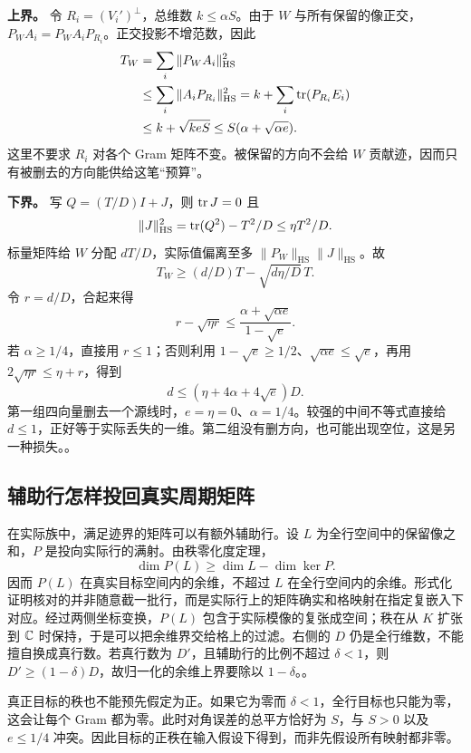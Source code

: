 \textbf{上界。} 令 $R_i=(V_i')^\perp$，总维数 $k\le\alpha S$。由于 $W$ 与所有保留的像正交，$P_WA_i=P_WA_iP_{R_i}$。正交投影不增范数，因此
\[
\begin{aligned}
 T_W &=\sum_i\|P_WA_i\|^2_{\mathrm{HS}}\\
 &\le \sum_i\|A_iP_{R_i}\|^2_{\mathrm{HS}}
 =k+\sum_i\operatorname{tr}(P_{R_i}E_i)\\
 &\le k+\sqrt{k e S}\le S(\alpha+\sqrt{\alpha e}).
\end{aligned}
\]
这里不要求 $R_i$ 对各个 Gram 矩阵不变。被保留的方向不会给 $W$ 贡献迹，因而只有被删去的方向能供给这笔“预算”。

\textbf{下界。} 写 $Q=(T/D)I+J$，则 $\operatorname{tr} J=0$ 且
\[
 \|J\|^2_{\mathrm{HS}}=\operatorname{tr}(Q^2)-T^2/D\le\eta T^2/D.
\]
标量矩阵给 $W$ 分配 $dT/D$，实际值偏离至多 $\|P_W\|_{\mathrm{HS}}\|J\|_{\mathrm{HS}}$。故
\[
             T_W\ge (d/D)T-\sqrt{d\eta/D}\,T.
\]
令 $r=d/D$，合起来得
\[
          r-\sqrt{\eta r}
             \le \frac{\alpha+\sqrt{\alpha e}}{1-\sqrt e}.
\]
若 $\alpha\ge1/4$，直接用 $r\le1$；否则利用 $1-\sqrt e\ge1/2$、$\sqrt{\alpha e}\le\sqrt e$，再用 $2\sqrt{\eta r}\le\eta+r$，得到
\[
                        d\le (\eta+4\alpha+4\sqrt e)D.
\]
第一组四向量删去一个源线时，$e=\eta=0$、$\alpha=1/4$。较强的中间不等式直接给 $d\le1$，正好等于实际丢失的一维。第二组没有删方向，也可能出现空位，这是另一种损失。。

\subsection{辅助行怎样投回真实周期矩阵}
在实际族中，满足迹界的矩阵可以有额外辅助行。设 $L$ 为全行空间中的保留像之和，$P$ 是投向实际行的满射。由秩零化度定理，
\[
 \dim P(L)\ge \dim L-\dim\ker P.
\]
因而 $P(L)$ 在真实目标空间内的余维，不超过 $L$ 在全行空间内的余维。形式化证明核对的并非随意截一批行，而是实际行上的矩阵确实和格映射在指定复嵌入下对应。经过两侧坐标变换，$P(L)$ 包含于实际模像的复张成空间；秩在从 $K$ 扩张到 $\mathbb C$ 时保持，于是可以把余维界交给格上的过滤。右侧的 $D$ 仍是全行维数，不能擅自换成真行数。若真行数为 $D'$，且辅助行的比例不超过 $\delta<1$，则 $D'\ge(1-\delta)D$，故归一化的余维上界要除以 $1-\delta$。。

真正目标的秩也不能预先假定为正。如果它为零而 $\delta<1$，全行目标也只能为零，这会让每个 Gram 都为零。此时对角误差的总平方恰好为 $S$，与 $S>0$ 以及 $e\le1/4$ 冲突。因此目标的正秩在输入假设下得到，而非先假设所有映射都非零。

